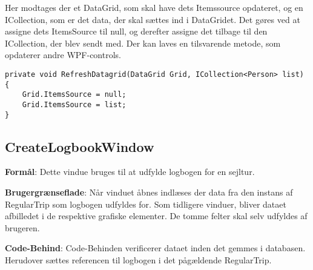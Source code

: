 Her modtages der et DataGrid, som skal have dets Itemssource opdateret, og en ICollection, som er det data, der skal sættes ind i DataGridet. 
Det gøres ved at assigne dets ItemsSource til null, og derefter assigne det tilbage til den ICollection, der blev sendt med. 
Der kan laves en tilsvarende metode, som opdaterer andre WPF-controls.

\begin{lstlisting}[frame=single, caption=Refresh Datagrid, label=RefreshDatagrid]
private void RefreshDatagrid(DataGrid Grid, ICollection<Person> list)
{
    Grid.ItemsSource = null;
    Grid.ItemsSource = list;
}
\end{lstlisting}

\subsection{CreateLogbookWindow}

\textbf{Formål}: 
Dette vindue bruges til at udfylde logbogen for en sejltur.

\textbf{Brugergrænseflade}:  
Når vinduet åbnes indlæses der data fra den instans af RegularTrip som logbogen udfyldes for.
Som tidligere vinduer, bliver dataet afbilledet i de respektive grafiske elementer. 
De tomme felter skal selv udfyldes af brugeren. 

\textbf{Code-Behind}: 
Code-Behinden verificerer dataet inden det gemmes i databasen.
Herudover sættes referencen til logbogen i det pågældende RegularTrip.

